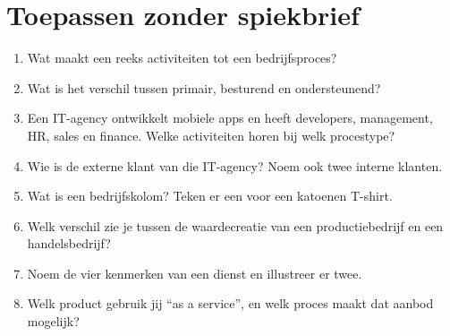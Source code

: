 \documentclass[11pt,a4paper]{article}
\begin{document}
\section{Toepassen zonder spiekbrief}

\begin{enumerate}
  \item Wat maakt een reeks activiteiten tot een bedrijfsproces?
  \item Wat is het verschil tussen primair, besturend en ondersteunend?
  \item Een IT-agency ontwikkelt mobiele apps en heeft developers, management,
        HR, sales en finance. Welke activiteiten horen bij welk procestype?
  \item Wie is de externe klant van die IT-agency? Noem ook twee interne klanten.
  \item Wat is een bedrijfskolom? Teken er een voor een katoenen T-shirt.
  \item Welk verschil zie je tussen de waardecreatie van een productiebedrijf en
        een handelsbedrijf?
  \item Noem de vier kenmerken van een dienst en illustreer er twee.
  \item Welk product gebruik jij ``as a service'', en welk proces maakt dat
        aanbod mogelijk?
\end{enumerate}
\end{document}
